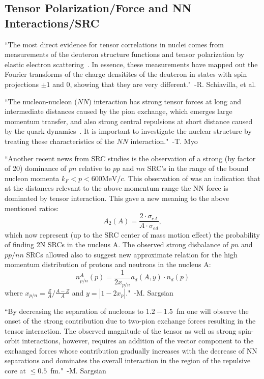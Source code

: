 \subsection{Tensor Polarization/Force and NN Interactions/SRC}
``The most direct evidence for tensor correlations in nuclei comes from measurements of the deuteron structure functions and tensor polarization by elastic electron scattering~\cite{Gilman:2001yh}. In essence, these measurements have mapped out the Fourier transforms of the charge densitites of the deuteron in states with spin projections $\pm1$ and 0, showing that they are very different."~-R. Schiavilla, et al.~\cite{Schiavilla:2006xx}

``The nucleon-nucleon ($NN$) interaction has strong tensor forces at long and intermediate distances caused by the pion exchange, which emerges large momentum transfer, and also strong central repulsions at short distance caused by the quark dynamics~\cite{Pieper:2001mp,Kamada:2001tv}. It is important to investigate the nuclear structure by treating these characteristics of the $NN$ interaction."~-T. Myo~\cite{Myo:2013dya}

``Another recent news from SRC studies is the observation of a strong (by factor of 20) dominance of $pn$ relative to $pp$ and $nn$ SRC's in the range of the bound nucleon momenta $k_F<p<600 \mathrm{MeV}/c$\cite{Piasetzky:2006ai,Subedi:2008zz}. This observation of was an indication that at the distances relevant to the above momentum range the NN force is dominated by tensor interaction. This gave a new meaning to the above mentioned ratios:
\begin{equation}
	A_2(A) = \frac{2\cdot \sigma_{eA}}{A\cdot \sigma_{ed}},
\end{equation}
which now represent (up to the SRC center of mass motion effect) the probability of finding 2N SRCs in the nucleus A. The observed strong disbalance of $pn$ and $pp/nn$ SRCs allowed also to suggest new approximate relation for the high momentum distribution of protons and neutrons in the nucleus A\cite{McGauley:2011qc}:
\begin{equation}
	n^A_{p/n}(p) = \frac{1}{2x_{p/n}}a_d(A,y)\cdot n_d(p)
\end{equation}
where $x_{p/n}=\frac{Z}{A}/\frac{A-Z}{A}$ and $y=\left| 1-2x_p\right|$."~-M. Sargsian~\cite{Sargsian:2012gj}


``By decreasing the separation of nucleons to $1.2-1.5$~fm one will observe the onset of the strong contribution due to two-pion exchange forces resulting in the tensor interaction. The observed magnitude of the tensor as well as strong spin-orbit interactions, however, requires an addition of the vector component to the exchanged forces whose contribution gradually increases with the decrease of NN separations and dominates the overall interaction in the region of the repulsive core at $\leq 0.5$~fm."~-M. Sargsian~\cite{Sargsian:2014bwa}


